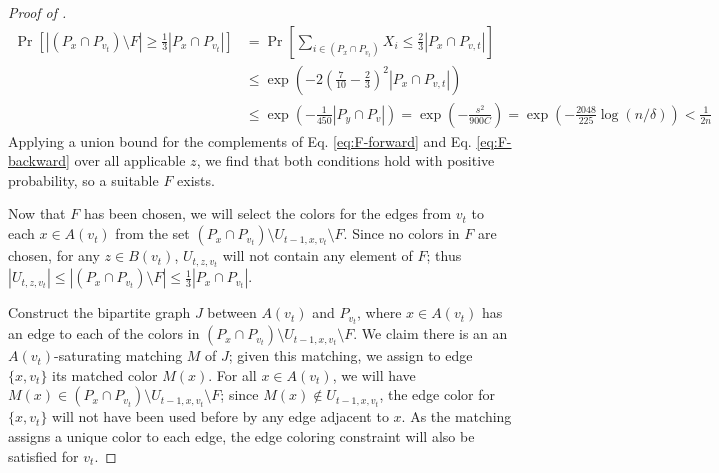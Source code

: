 \documentclass[10pt]{article}
\theoremstyle{definition}\newtheorem{definition}[lemma]{Definition}
\theoremstyle{remark}  \newtheorem*{remark}{Remark}
\begin{document}
\begin{proof}[Proof of ]
\begin{align*}
    \Pr\left[ |(P_x \cap P_{v_t}) \setminus F| \ge \frac{1}{3} |P_x \cap P_{v_t}| \right] 
      &= \Pr\left[ \sum_{i \in (P_x \cap P_{v_t})} X_i \le \frac{2}{3} |P_x \cap P_{v,t}| \right] \\
      &\le \exp\left( -2 \left(\frac{7}{10} - \frac{2}{3}\right)^2 |P_x \cap P_{v,t}| \right) \\
      &\le \exp\left(-\frac{1}{450} |P_y \cap P_v|\right) = \exp\left(-\frac{s^2}{900 C}\right) = \exp\left(- \frac{2048}{225} \log(n/\delta)\right) < \frac{1}{2n}
  \end{align*}
  Applying a union bound for the complements of Eq. \ref{eq:F-forward} and Eq. \ref{eq:F-backward} over all applicable $z$, we find that both conditions hold with positive probability, so a suitable $F$ exists.
  
  Now that $F$ has been chosen, we will select the colors for the edges from $v_t$ to each $x \in A(v_t)$ from the set $(P_x \cap P_{v_t}) \setminus U_{t-1,x,v_t} \setminus F$. Since no colors in $F$ are chosen, for any $z \in B(v_t)$, $U_{t,z,v_t}$ will not contain any element of $F$; thus $|U_{t,z,v_t}| \le |(P_x \cap P_{v_t}) \setminus F| \le \frac{1}{3} |P_x \cap P_{v_t}|$.
  
  Construct the bipartite graph $J$ between $A(v_t)$ and $P_{v_t}$, where $x \in A(v_t)$ has an edge to each of the colors in $(P_x \cap P_{v_t}) \setminus U_{t-1,x,v_t} \setminus F$. We claim there is an an $A(v_t)$-saturating matching $M$ of $J$; given this matching, we assign to edge $\{x,v_t\}$ its matched color $M(x)$. For all $x \in A(v_t)$, we will have $M(x) \in (P_x \cap P_{v_t}) \setminus U_{t-1,x,v_t} \setminus F$; since $M(x) \notin U_{t-1,x,v_t}$, the edge color for $\{x,v_t\}$ will not have been used before by any edge adjacent to $x$.
  As the matching assigns a unique color to each edge, the edge coloring constraint will also be satisfied for $v_t$.
  

\end{proof}
\end{document}
